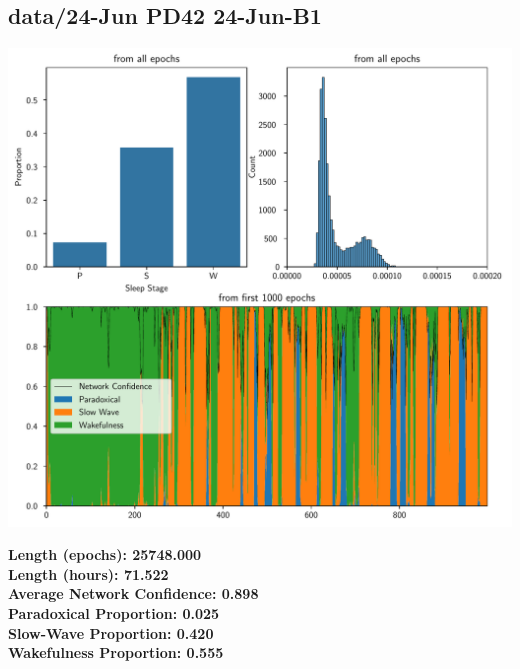         \subsection*{ data/24-Jun PD42 24-Jun-B1 }
        \begin{center}
        \begin{adjustbox}{width=1\textwidth}
        \includegraphics[page=29]{figs.pdf}
        \end{adjustbox}
        \end{center}
        \large\textbf{Length (epochs): 25748.000}\\
        \textbf{Length (hours): 71.522}\\
        \textbf{Average Network Confidence: 0.898}\\
        \textbf{Paradoxical Proportion: 0.025}\\
        \textbf{Slow-Wave Proportion: 0.420}\\
        \textbf{Wakefulness Proportion: 0.555}\\
        